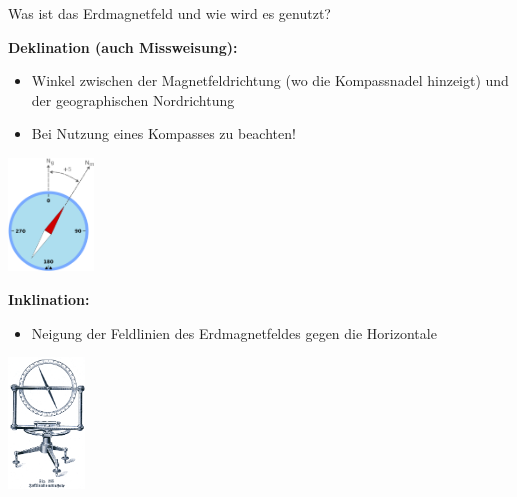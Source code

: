 \documentclass[10pt]{beamer}
\begin{document}
\begin{frame}{Was ist das Erdmagnetfeld und wie wird es genutzt?}
    \begin{minipage}[c]{0.7\textwidth}
    \vspace{1cm}
    \textbf{Deklination (auch Missweisung):}\pause
        \begin{itemize}
            \item Winkel zwischen der Magnetfeldrichtung (wo die Kompassnadel hinzeigt)
             und der geographischen Nordrichtung
            \item Bei Nutzung eines Kompasses zu beachten!\pause
            \vspace{0.5cm}
    \end{itemize}
\end{minipage}
\begin{minipage}[c]{0.25\textwidth}
    \includegraphics[height = 3cm]{Deklination.png}
\end{minipage}

\begin{minipage}[b]{0.7\textwidth}
\textbf{Inklination:}\pause
    \begin{itemize}
        \item Neigung der Feldlinien des Erdmagnetfeldes gegen die Horizontale\pause
    \end{itemize}
\end{minipage}
\begin{minipage}[c]{0.25\textwidth}
    \includegraphics[height = 3.5cm]{Inklinationsbussole.png}
\end{minipage}
\end{frame}
\end{document}
